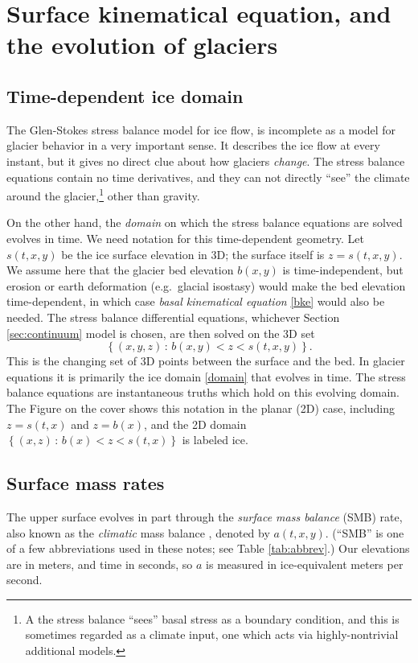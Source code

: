 \documentclass[letterpaper,final,12pt,reqno]{amsart}
\begin{document}
\section{Surface kinematical equation, and the evolution of glaciers}   \label{sec:masscont}

\subsection*{Time-dependent ice domain}  The Glen-Stokes stress balance model for ice flow, is incomplete as a model for glacier behavior in a very important sense.  It describes the ice flow at every instant, but it gives no direct clue about how glaciers \emph{change}.  The stress balance equations contain no time derivatives, and they can not directly ``see'' the climate around the glacier,\footnote{A the stress balance ``sees'' basal stress as a boundary condition, and this is sometimes regarded as a climate input, one which acts via highly-nontrivial additional models.} other than gravity.

On the other hand, the \emph{domain} on which the stress balance equations are solved evolves in time.  We need notation for this time-dependent geometry.  Let $s(t,x,y)$ be the ice surface elevation in 3D; the surface itself is $z=s(t,x,y)$.  We assume here that the glacier bed elevation $b(x,y)$ is time-independent, but erosion or earth deformation (e.g.~glacial isostasy) would make the bed elevation time-dependent, in which case \emph{basal kinematical equation} \eqref{bke} would also be needed.  The stress balance differential equations, whichever Section \ref{sec:continuum} model is chosen, are then solved on the 3D set
\begin{equation}
\left\{(x,y,z)\,:\,b(x,y) < z < s(t,x,y)\right\}. \label{domain}
\end{equation}
This is the changing set of 3D points between the surface and the bed.  In glacier equations it is primarily the ice domain \eqref{domain} that evolves in time.  The stress balance equations are instantaneous truths which hold on this evolving domain.  The Figure on the cover shows this notation in the planar (2D) case, including $z=s(t,x)$ and $z=b(x)$, and the 2D domain $\left\{(x,z)\,:\,b(x) < z < s(t,x)\right\}$ is labeled \textsf{ice}.

\subsection*{Surface mass rates}  The upper surface evolves in part through the \emph{surface mass balance} (SMB) rate, also known as the \emph{climatic} mass balance \cite{Cogleyetal2011}, denoted by $a(t,x,y)$.  (``SMB'' is one of a few abbreviations used in these notes; see Table \ref{tab:abbrev}.)  Our elevations are in meters, and time in seconds, so $a$ is measured in ice-equivalent meters per second.
\end{document}
